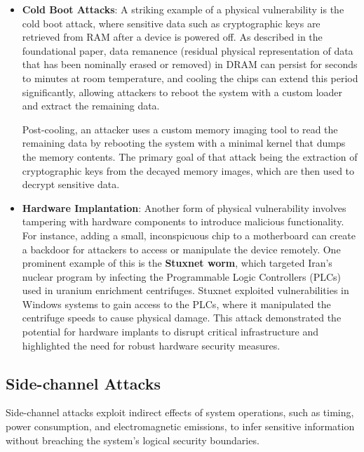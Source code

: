 \begin{itemize}
\item
  \textbf{Cold Boot Attacks}: A striking example of a physical
  vulnerability is the cold boot attack\cite{haldermanLestWeRemember2009}, 
  where sensitive data such as
  cryptographic keys are retrieved from RAM after a device is powered
  off. As described in the foundational paper, data remanence (residual physical representation of data that has been nominally erased or removed) in DRAM can persist for seconds to minutes at room
  temperature, and cooling the chips can extend this period
  significantly, allowing attackers to reboot the system with a custom
  loader and extract the remaining data.

  Post-cooling, an attacker uses a custom memory imaging tool to read the remaining data by rebooting the system with a minimal kernel that dumps the memory contents.
  The primary goal of that attack being the extraction of cryptographic keys from the decayed memory images, which are then used to decrypt sensitive data.

\item
  \textbf{Hardware Implantation}: Another form of physical vulnerability
  involves tampering with hardware components to introduce malicious
  functionality. For instance, adding a small, inconspicuous chip to a
  motherboard can create a backdoor for attackers to access or
  manipulate the device remotely.
  One prominent example of this is the \textbf{Stuxnet worm}, which targeted Iran's nuclear program by infecting the Programmable Logic Controllers (PLCs) used in uranium enrichment centrifuges. 
  Stuxnet exploited vulnerabilities in Windows systems to gain access to the PLCs, where it manipulated the centrifuge speeds to cause physical damage. 
  This attack demonstrated the potential for hardware implants to disrupt critical infrastructure and highlighted the need for robust hardware security measures.\cite{kushnerRealStoryStuxnet2013,nicolasfalliereW32StuxnetDossier}
\end{itemize}

\hypertarget{side-channel-attacks}{%
\subsection{Side-channel Attacks}\label{side-channel-attacks}}

Side-channel attacks exploit indirect effects of system operations, such
as timing, power consumption, and electromagnetic emissions, to infer
sensitive information without breaching the system's logical security
boundaries.

